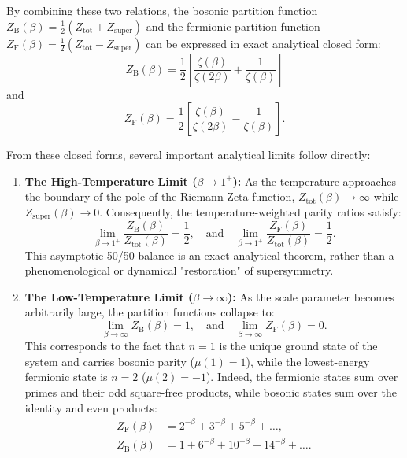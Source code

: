 \documentclass[11pt,a4paper]{article}
\theoremstyle{definition}
\begin{document}
	By combining these two relations, the bosonic partition function $Z_{\text{B}}(\beta) = \frac{1}{2}(Z_{\text{tot}} + Z_{\text{super}})$ and the fermionic partition function $Z_{\text{F}}(\beta) = \frac{1}{2}(Z_{\text{tot}} - Z_{\text{super}})$ can be expressed in exact analytical closed form:
	\begin{equation}
		\boxed{
			Z_{\text{B}}(\beta) = \frac{1}{2} \left[ \frac{\zeta(\beta)}{\zeta(2\beta)} + \frac{1}{\zeta(\beta)} \right]
		}
	\end{equation}
	and
	\begin{equation}
		\boxed{
			Z_{\text{F}}(\beta) = \frac{1}{2} \left[ \frac{\zeta(\beta)}{\zeta(2\beta)} - \frac{1}{\zeta(\beta)} \right].
		}
	\end{equation}
	
	From these closed forms, several important analytical limits follow directly:
	\begin{enumerate}
		\item \textbf{The High-Temperature Limit ($\beta \to 1^+$):} As the temperature approaches the boundary of the pole of the Riemann Zeta function, $Z_{\text{tot}}(\beta) \to \infty$ while $Z_{\text{super}}(\beta) \to 0$. Consequently, the temperature-weighted parity ratios satisfy:
		\begin{equation}
			\lim_{\beta \to 1^+} \frac{Z_{\text{B}}(\beta)}{Z_{\text{tot}}(\beta)} = \frac{1}{2}, \quad \text{and} \quad \lim_{\beta \to 1^+} \frac{Z_{\text{F}}(\beta)}{Z_{\text{tot}}(\beta)} = \frac{1}{2}.
		\end{equation}
		This asymptotic 50/50 balance is an exact analytical theorem, rather than a phenomenological or dynamical "restoration" of supersymmetry.
		\item \textbf{The Low-Temperature Limit ($\beta \to \infty$):} As the scale parameter becomes arbitrarily large, the partition functions collapse to:
		\begin{equation}
			\lim_{\beta \to \infty} Z_{\text{B}}(\beta) = 1, \quad \text{and} \quad \lim_{\beta \to \infty} Z_{\text{F}}(\beta) = 0.
		\end{equation}
		This corresponds to the fact that $n=1$ is the unique ground state of the system and carries bosonic parity ($\mu(1)=1$), while the lowest-energy fermionic state is $n=2$ ($\mu(2)=-1$). Indeed, the fermionic states sum over primes and their odd square-free products, while bosonic states sum over the identity and even products:
		\begin{align}
			Z_{\text{F}}(\beta) &= 2^{-\beta} + 3^{-\beta} + 5^{-\beta} + \dots, \\
			Z_{\text{B}}(\beta) &= 1 + 6^{-\beta} + 10^{-\beta} + 14^{-\beta} + \dots.
		\end{align}
	\end{enumerate}
	
\end{document}
